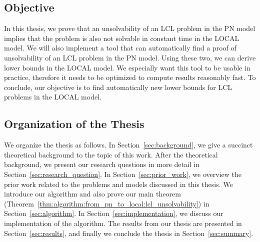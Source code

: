\subsection{Objective}
In this thesis, we prove that an unsolvability of an LCL problem in the PN model implies that the problem is also not solvable in constant time in the LOCAL model.
We will also implement a tool that can automatically find a proof of unsolvability of an LCL problem in the PN model.
Using these two, we can derive lower bounds in the LOCAL model.
We especially want this tool to be usable in practice, therefore it needs to be optimized to compute results reasonably fast.
To conclude, our objective is to find automatically new lower bounds for LCL problems in the LOCAL model.

\subsection{Organization of the Thesis}
We organize the thesis as follows.
In Section~\ref{sec:background}, we give a succinct theoretical background to the topic of this work.
After the theoretical background, we present our research questions in more detail in Section~\ref{sec:research_question}.
In Section~\ref{sec:prior_work}, we overview the prior work related to the problems and models discussed in this thesis.
We introduce our algorithm and also prove our main theorem (Theorem~\ref{thm:algorithm:from_pn_to_local:lcl_unsolvability}) in Section~\ref{sec:algorithm}.
In Section~\ref{sec:implementation}, we discuss our implementation of the algorithm.
The results from our thesis are presented in Section~\ref{sec:results}, and finally we conclude the thesis in Section~\ref{sec:summary}.
